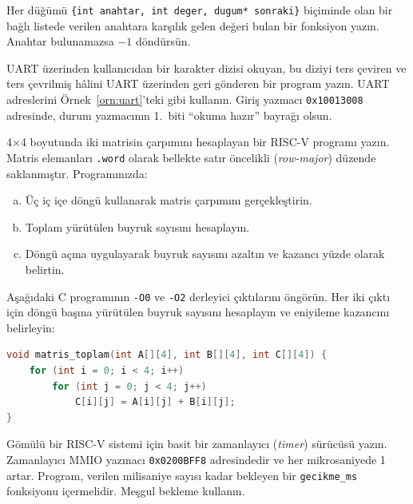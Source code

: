 \begin{alistirma}[\orta]
Her düğümü \texttt{\{int anahtar, int deger, dugum* sonraki\}} biçiminde olan bir bağlı listede verilen anahtara karşılık gelen değeri bulan bir fonksiyon yazın. Anahtar bulunamazsa $-1$ döndürsün.
\end{alistirma}

\begin{alistirma}[\orta]
UART üzerinden kullanıcıdan bir karakter dizisi okuyan, bu diziyi ters çeviren ve ters çevrilmiş hâlini UART üzerinden geri gönderen bir program yazın. UART adreslerini Örnek~\ref{orn:uart}'teki gibi kullanın. Giriş yazmacı \texttt{0x10013008} adresinde, durum yazmacının 1.\ biti ``okuma hazır'' bayrağı olsun.
\end{alistirma}

\begin{alistirma}[\zor]
4$\times$4 boyutunda iki matrisin çarpımını hesaplayan bir RISC-V programı yazın. Matris elemanları \texttt{.word} olarak bellekte satır öncelikli (\emph{row-major}) düzende saklanmıştır. Programınızda:
\begin{enumerate}[(a)]
\item Üç iç içe döngü kullanarak matris çarpımını gerçekleştirin.
\item Toplam yürütülen buyruk sayısını hesaplayın.
\item Döngü açma uygulayarak buyruk sayısını azaltın ve kazancı yüzde olarak belirtin.
\end{enumerate}
\end{alistirma}

\begin{alistirma}[\zor]
Aşağıdaki C programının \texttt{-O0} ve \texttt{-O2} derleyici çıktılarını öngörün. Her iki çıktı için döngü başına yürütülen buyruk sayısını hesaplayın ve eniyileme kazancını belirleyin:
\begin{lstlisting}[language=C, style=alistirma-kod]
void matris_toplam(int A[][4], int B[][4], int C[][4]) {
    for (int i = 0; i < 4; i++)
        for (int j = 0; j < 4; j++)
            C[i][j] = A[i][j] + B[i][j];
}
\end{lstlisting}
\end{alistirma}

\begin{alistirma}[\zor]
Gömülü bir RISC-V sistemi için basit bir zamanlayıcı (\emph{timer}) sürücüsü yazın. Zamanlayıcı MMIO yazmacı \texttt{0x0200BFF8} adresindedir ve her mikrosaniyede 1 artar. Program, verilen milisaniye sayısı kadar bekleyen bir \texttt{gecikme\_ms} fonksiyonu içermelidir. Meşgul bekleme kullanın.
\end{alistirma}

